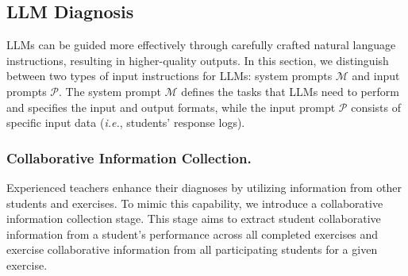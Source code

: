 \subsection{LLM Diagnosis}
LLMs can be guided more effectively through carefully crafted natural language instructions, resulting in higher-quality outputs. In this section, we distinguish between two types of input instructions for LLMs: 
system prompts $\mathcal{M}$ and input prompts $\mathcal{P}$. The system prompt $\mathcal{M}$ defines the tasks that LLMs need to perform and specifies the input and output formats, while the input prompt $\mathcal{P}$ consists of specific input data (\textit{i.e.}, students' response logs). 


\subsubsection{Collaborative Information Collection.}
Experienced teachers enhance their diagnoses by utilizing information from other students and exercises. To mimic this capability, we introduce a collaborative information collection stage. This stage aims to extract student collaborative information from a student's performance across all completed exercises and exercise collaborative information from all participating students for a given exercise. 

